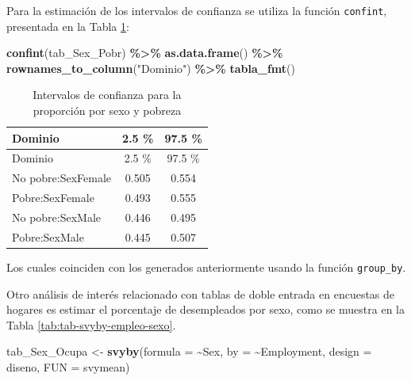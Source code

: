 \documentclass[
  spanish,
  12pt,
]{book}
\newenvironment{Shaded}{\begin{snugshade}}{\end{snugshade}}
\newcommand{\AttributeTok}[1]{\textcolor[rgb]{0.13,0.29,0.53}{#1}}
\newcommand{\FunctionTok}[1]{\textcolor[rgb]{0.13,0.29,0.53}{\textbf{#1}}}
\newcommand{\NormalTok}[1]{#1}
\newcommand{\OtherTok}[1]{\textcolor[rgb]{0.56,0.35,0.01}{#1}}
\newcommand{\SpecialCharTok}[1]{\textcolor[rgb]{0.81,0.36,0.00}{\textbf{#1}}}
\newcommand{\StringTok}[1]{\textcolor[rgb]{0.31,0.60,0.02}{#1}}
\begin{document}
Para la estimación de los intervalos de confianza se utiliza la función \texttt{confint}, presentada en la Tabla \ref{tab:tab-confint-sexo-pobreza}:

\begin{Shaded}
\begin{Highlighting}[]
\FunctionTok{confint}\NormalTok{(tab\_Sex\_Pobr) }\SpecialCharTok{\%\textgreater{}\%} 
  \FunctionTok{as.data.frame}\NormalTok{() }\SpecialCharTok{\%\textgreater{}\%}
  \FunctionTok{rownames\_to\_column}\NormalTok{(}\StringTok{"Dominio"}\NormalTok{) }\SpecialCharTok{\%\textgreater{}\%}
  \FunctionTok{tabla\_fmt}\NormalTok{()}
\end{Highlighting}
\end{Shaded}

\begin{longtable}[]{@{}lcc@{}}
\caption{\label{tab:tab-confint-sexo-pobreza}Intervalos de confianza para la proporción por sexo y pobreza}\tabularnewline
\toprule\noalign{}
Dominio & 2.5 \% & 97.5 \% \\
\midrule\noalign{}
\endfirsthead
\toprule\noalign{}
Dominio & 2.5 \% & 97.5 \% \\
\midrule\noalign{}
\endhead
\bottomrule\noalign{}
\endlastfoot
No pobre:SexFemale & 0.505 & 0.554 \\
Pobre:SexFemale & 0.493 & 0.555 \\
No pobre:SexMale & 0.446 & 0.495 \\
Pobre:SexMale & 0.445 & 0.507 \\
\end{longtable}

Los cuales coinciden con los generados anteriormente usando la función \texttt{group\_by}.

Otro análisis de interés relacionado con tablas de doble entrada en encuestas de hogares es estimar el porcentaje de desempleados por sexo, como se muestra en la Tabla \ref{tab:tab-svyby-empleo-sexo}.

\begin{Shaded}
\begin{Highlighting}[]
\NormalTok{tab\_Sex\_Ocupa }\OtherTok{\textless{}{-}} \FunctionTok{svyby}\NormalTok{(}\AttributeTok{formula =} \SpecialCharTok{\textasciitilde{}}\NormalTok{Sex, }\AttributeTok{by =} \SpecialCharTok{\textasciitilde{}}\NormalTok{Employment,}
                       \AttributeTok{design =}\NormalTok{ diseno, }\AttributeTok{FUN =}\NormalTok{ svymean)}
\end{Highlighting}
\end{Shaded}
\end{document}
